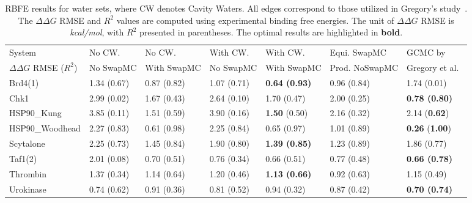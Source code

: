 \documentclass[journal=jacsat,manuscript=article]{achemso}
\begin{document}
\begin{table}
  \caption{RBFE results for water sets, where CW denotes Cavity Waters. All edges correspond to those utilized in Gregory's study~\cite{ross2020enhancing}. 
  The $\Delta\Delta G$ RMSE and $R^2$ values are computed using experimental binding free energies. 
  The unit of $\Delta\Delta G$ RMSE is \textit{kcal/mol}, with $R^2$ presented in parentheses. 
  The optimal results are highlighted in \textbf{bold}.}
  \label{tbl:rbfe_watersets}
  \scriptsize
  \begin{tabular}{l|llllll}
    \hline
    System                                  & No CW.     & No CW.        & With CW.    & With CW.     &  Equi. SwapMC      & GCMC by  \\
    $\Delta \Delta G$ RMSE ($R^2$)          & No SwapMC  & With SwapMC   & No SwapMC   & With SwapMC  &  Prod. NoSwapMC    & Gregory et al.~\cite{ross2020enhancing} \\
    \hline
    Brd4(1)                      & 1.34 (0.67) & 0.87 (0.82) & 1.07 (0.71) & \textbf{0.64 (0.93)}     &  0.96 (0.84)       & 1.74 (0.01) \\
    Chk1                         & 2.99 (0.02) & 1.67 (0.43) & 2.64 (0.10) & 1.70 (0.47)              &  2.00 (0.25)       & \textbf{0.78 (0.80)} \\
    HSP90\_Kung                  & 3.85 (0.11) & 1.51 (0.59) & 3.90 (0.16) & \textbf{1.50} (0.50)     &  2.16 (0.32)       & 2.14 (\textbf{0.62}) \\
    HSP90\_Woodhead              & 2.27 (0.83) & 0.61 (0.98) & 2.25 (0.84) & 0.65 (0.97)              &  1.01 (0.89)       & \textbf{0.26} (\textbf{1.00}) \\
    Scytalone                    & 2.25 (0.73) & 1.45 (0.84) & 1.90 (0.80) & \textbf{1.39 (0.85)}     &  1.23 (0.89)       & 1.86 (0.77) \\
    Taf1(2)                      & 2.01 (0.08) & 0.70 (0.51) & 0.76 (0.34) & 0.66 (0.51)              &  0.77 (0.48)       & \textbf{0.66 (0.78)} \\
    Thrombin                     & 1.37 (0.34) & 1.14 (0.64) & 1.20 (0.46) & \textbf{1.13 (0.66)}     &  0.92 (0.63)       & 1.15 (0.49) \\
    Urokinase                    & 0.74 (0.62) & 0.91 (0.36) & 0.81 (0.52) & 0.94 (0.32)              &  0.87 (0.42)       & \textbf{0.70 (0.74)} \\
    \hline
  \end{tabular}
\end{table}
\end{document}
